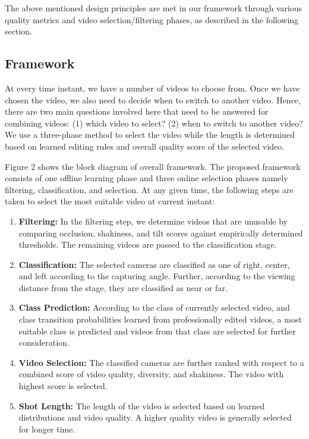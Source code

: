 \documentclass{clsfile}
\begin{document}
The above mentioned design principles are met in our framework
through various quality metrics and video selection/filtering phases,
as described in the following section.
\subsection{Framework}
At every time instant, we have a number of videos to choose
from. Once we have chosen the video, we also need to decide when
to switch to another video. Hence, there are two main questions
involved here that need to be answered for combining videos: (1)
which video to select? (2) when to switch to another video? We
use a three-phase method to select the video while the length is
determined based on learned editing rules and overall quality score
of the selected video.

Figure 2 shows the block diagram of overall framework. The
proposed framework consists of one offline learning phase and three online selection phases namely filtering, classification, and selection.
At any given time, the following steps are taken to select the
most suitable video at current instant:
\begin{enumerate}
    \item \textbf{Filtering:} In the filtering step, we determine videos that are
unusable by comparing occlusion, shakiness, and tilt scores
against empirically determined thresholds. The remaining
videos are passed to the classification stage.
\item \textbf{Classification:} The selected cameras are classified as one
of right, center, and left according to the capturing angle.
Further, according to the viewing distance from the stage,
they are classified as near or far.
\item \textbf{Class Prediction:} According to the class of currently selected
video, and class transition probabilities learned from
professionally edited videos, a most suitable class is predicted
and videos from that class are selected for further consideration.
\item \textbf{Video Selection:} The classified cameras are further ranked
with respect to a combined score of video quality, diversity,
and shakiness. The video with highest score is selected.
\item \textbf{Shot Length:} The length of the video is selected based on
learned distributions and video quality. A higher quality video
is generally selected for longer time.
\end{enumerate}
\end{document}
